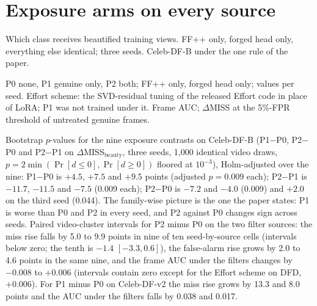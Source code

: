 \documentclass[10pt]{article}
\begin{document}
\section{Exposure arms on every source}
\label{sec:exposure}
\begin{table}[H]
\centering
\caption{Which class receives beautified training views. FF++ only, forged head only, everything else identical; three seeds.
Celeb-DF-B under the one rule of the paper.}
\label{tab:exposure}
\footnotesize
\begin{adjustbox}{max width=\linewidth}\end{adjustbox}
\end{table}
\begin{table}[H]
\centering
\caption{P0 none, P1 genuine only, P2 both; FF++ only, forged head only; values per seed. Effort scheme: the SVD-residual tuning
of the released Effort code in place of LoRA; P1 was not trained under it. Frame AUC; $\Delta$MISS at the 5\%-FPR threshold of
untreated genuine frames.}
\label{tab:exposure_ext}
\footnotesize
\begin{adjustbox}{max width=\linewidth}\end{adjustbox}
\end{table}
Bootstrap $p$-values for the nine exposure contrasts on Celeb-DF-B (P1$-$P0, P2$-$P0 and P2$-$P1 on
$\Delta$MISS$_\text{beauty}$, three seeds, 1,000 identical video draws, $p=2\min(\Pr[d\le0],\Pr[d\ge0])$ floored at $10^{-3}$),
Holm-adjusted over the nine: P1$-$P0 is $+4.5$, $+7.5$ and $+9.5$ points (adjusted $p=0.009$ each); P2$-$P1 is $-11.7$, $-11.5$ and
$-7.5$ (0.009 each); P2$-$P0 is $-7.2$ and $-4.0$ (0.009) and $+2.0$ on the third seed (0.044). The family-wise picture is the one the
paper states: P1 is worse than P0 and P2 in every seed, and P2 against P0 changes sign across seeds.
Paired video-cluster intervals for P2 minus P0 on the two filter sources: the miss rise falls by 5.0 to 9.9 points in nine of ten
seed-by-source cells (intervals below zero; the tenth is $-1.4$ $[-3.3, 0.6]$), the false-alarm rise grows by 2.0 to 4.6 points in
the same nine, and the frame AUC under the filters changes by $-0.008$ to $+0.006$ (intervals contain zero except for the Effort
scheme on DFD, $+0.006$). For P1 minus P0 on Celeb-DF-v2 the miss rise grows by 13.3 and 8.0 points and the AUC under the filters
falls by 0.038 and 0.017.
\end{document}
